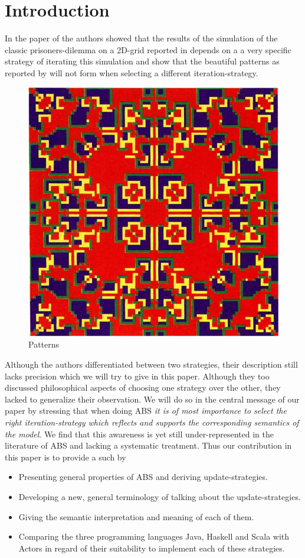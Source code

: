 \section{Introduction}
In the paper of \cite{huberman_evolutionary_1993} the authors showed that the results of the simulation of the classic prisoners-dilemma on a 2D-grid reported in \cite{nowak_evolutionary_1992} depends on a a very specific strategy of iterating this simulation and show that the beautiful patterns as reported by \cite{nowak_evolutionary_1992} will not form when selecting a different iteration-strategy.

\begin{figure}[H]
	\centering
  \includegraphics[width=.6\textwidth, angle=0]{./fig/sync_patterns.png}
	\caption{Patterns}
	\label{fig:sync_patterns}
\end{figure}

Although the authors differentiated between two strategies, their description still lacks precision which we will try to give in this paper. Although they too discussed philosophical aspects of choosing one strategy over the other, they lacked to generalize their observation. We will do so in the central message of our paper by stressing that when doing ABS \textit{it is of most importance to select the right iteration-strategy which reflects and supports the corresponding semantics of the model}. We find that this awareness is yet still under-represented in the literature of ABS and lacking a systematic treatment. Thus our contribution in this paper is to provide a such by
\begin{itemize}
	\item Presenting general properties of ABS and deriving update-strategies.
	\item Developing a new, general terminology of talking about the update-strategies.
	\item Giving the semantic interpretation and meaning of each of them.
	\item Comparing the three programming languages Java, Haskell and Scala with Actors in regard of their suitability to implement each of these strategies.
\end{itemize}

